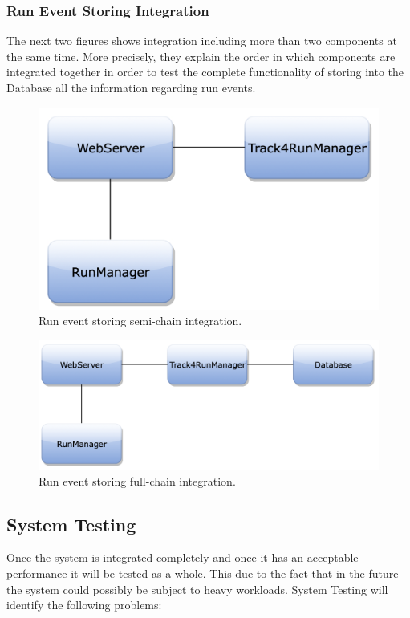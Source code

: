 \subsubsection{Run Event Storing Integration}
The next two figures shows integration including more than two components at the same time. More precisely, they explain the order in which components are integrated together in order to test the complete functionality of storing into the Database all the information regarding run events. 
\begin{figure}[H]
\centering
\includegraphics[scale=0.35]{Images/IntegrationPlanImages/fig17.png}
\caption{Run event storing semi-chain integration.}
\end{figure}

\begin{figure}[H]
\centering
\includegraphics[scale=0.35]{Images/IntegrationPlanImages/fig18.png}
\caption{Run event storing full-chain integration.}
\end{figure}


\subsection{System Testing}
Once the system is integrated completely and once it has an acceptable performance it will be tested as a whole. This due to the fact that in the future the system could possibly be subject to heavy workloads. System Testing will identify the following problems:

